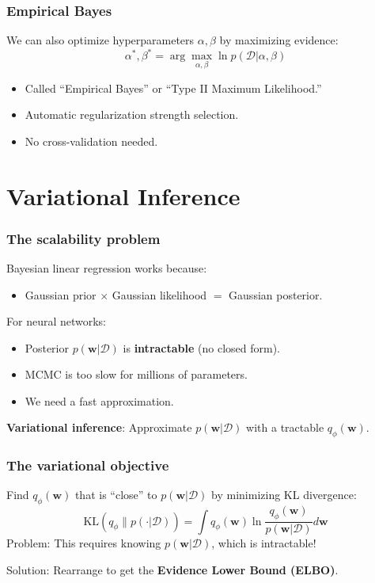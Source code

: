 \documentclass{beamer}
\begin{document}
\begin{frame}
\frametitle{Empirical Bayes}
We can also optimize hyperparameters $\alpha, \beta$ by maximizing evidence:
\[
\alpha^*, \beta^* = \arg\max_{\alpha, \beta} \ln p(\mathcal{D}|\alpha, \beta)
\]
\vspace{0.2cm}
\begin{itemize}
    \item Called ``Empirical Bayes'' or ``Type II Maximum Likelihood.''
    \item Automatic regularization strength selection.
    \item No cross-validation needed.
\end{itemize}
\end{frame}

\section{Variational Inference}

\begin{frame}
\frametitle{The scalability problem}
Bayesian linear regression works because:
\begin{itemize}
    \item Gaussian prior $\times$ Gaussian likelihood $=$ Gaussian posterior.
\end{itemize}
\vspace{0.3cm}
For neural networks:
\begin{itemize}
    \item Posterior $p(\mathbf{w}|\mathcal{D})$ is \textbf{intractable} (no closed form).
    \item MCMC is too slow for millions of parameters.
    \item We need a fast approximation.
\end{itemize}
\vspace{0.3cm}
\textbf{Variational inference}: Approximate $p(\mathbf{w}|\mathcal{D})$ with a tractable $q_\phi(\mathbf{w})$.
\end{frame}

\begin{frame}
\frametitle{The variational objective}
Find $q_\phi(\mathbf{w})$ that is ``close'' to $p(\mathbf{w}|\mathcal{D})$ by minimizing KL divergence:
\[
\text{KL}(q_\phi \| p(\cdot|\mathcal{D})) = \int q_\phi(\mathbf{w}) \ln \frac{q_\phi(\mathbf{w})}{p(\mathbf{w}|\mathcal{D})} d\mathbf{w}
\]
\vspace{0.2cm}
Problem: This requires knowing $p(\mathbf{w}|\mathcal{D})$, which is intractable!
\vspace{0.3cm}

Solution: Rearrange to get the \textbf{Evidence Lower Bound (ELBO)}.
\end{frame}
\end{document}
